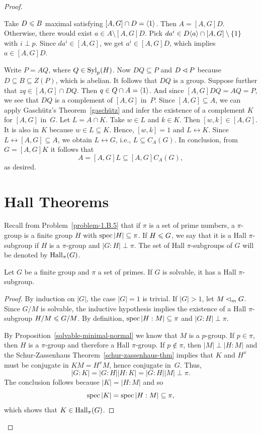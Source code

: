 \begin{proof}
\begin{solution}
\begin{description}
    Take $D\leqslant B$ maximal satisfying $[A,G]\cap D=\langle1\rangle$. Then $A=[A,G]D$. Otherwise, there would exist $a\in A\setminus[A,G]D$. Pick $da^i\in D\langle a\rangle\cap[A,G]\setminus\{1\}$ with $i\perp p$. Since $da^i\in[A,G]$, we get $a^i\in[A,G]D$, which implies $a\in[A,G]D$.

    Write $P=AQ$, where $Q\in{\rm Syl}_p(H)$. Now $DQ\subseteq P$ and $D\lhd P$ because $D\subseteq B\subseteq Z(P)$, which is abelian. It follows that $DQ$ is a group. Suppose further that $zq\in [A,G]\cap DQ$. Then $q\in Q\cap A=\langle1\rangle$. And since $[A,G]DQ=AQ=P$, we see that $DQ$ is a complement of $[A,G]$ in~$P$. Since $[A,G]\subseteq A$, we can apply Gasch\"utz's Theorem~\ref{gaschütz} and infer the existence of a complement $K$ for $[A,G]$ in~$G$. Let $L=A\cap K$. Take $w\in L$ and $k\in K$. Then $[w,k]\in[A,G]$. It is also in $K$ because $w\in L\subseteq K$. Hence, $[w,k]=1$ and $L\leftrightarrow K$. Since $L\leftrightarrow [A,G]\subseteq A$, we obtain $L\leftrightarrow G$, i.e., $L\subseteq C_A(G)$. In conclusion, from $G=[A,G]K$ it follows that
    $$
        A=[A,G]L\subseteq [A,G]C_A(G),
    $$
    as desired.
\end{description}
\end{solution}


\section{Hall Theorems}
Recall from Problem~\ref{problem-1.B.5} that if $\pi$ is a set of prime numbers, a $\pi$-group is a finite group $H$ with $\operatorname{spec}|H|\subseteq\pi$. If $H\leqslant G$, we say that it is a Hall $\pi$-subgroup if $H$ is a $\pi$-group and $|G:H|\perp\pi$. The set of Hall $\pi$-subgroups of $G$ will be denoted by ${\rm Hall}_\pi(G)$.

\begin{thm}{\upshape[Hall-E]}\label{hall-e}
    Let\/ $G$ be a finite group and $\pi$ a set of primes. If\/ $G$ is solvable, it has a Hall\/ $\pi$-subgroup.
\end{thm}

\begin{proof}
    By induction on $|G|$, the case $|G|=1$ is trivial. If $|G|>1$, let $M\lhd_mG$. Since $G/M$ is solvable, the inductive hypothesis implies the existence of a Hall $\pi$-subgroup $H/M\leqslant G/M$. By definition, $\operatorname{spec}|H:M|\subseteq\pi$ and $|G:H|\perp\pi$.

    By Proposition~\ref{solvable-minimal-normal} we know that $M$ is a $p$-group. If $p\in\pi$, then $H$ is a $\pi$-group and therefore a Hall $\pi$-group. If $p\notin\pi$, then $|M|\perp|H:M|$ and the Schur-Zassenhaus Theorem~\ref{schur-zassenhaus-thm} implies that $K$ and $H^x$ must be conjugate in $KM=H^xM$, hence conjugate in~$G$. Thus,
    $$
        |G:K|=|G:H||H:K|=|G:H||M|\perp\pi.
    $$
    The conclusion follows because $|K|=|H:M|$ and so
    $$
        \operatorname{spec}|K|=\operatorname{spec}|H:M|\subseteq\pi,
    $$
    which shows that $K\in{\rm Hall}_\pi(G)$.
\end{proof}



\end{proof}
